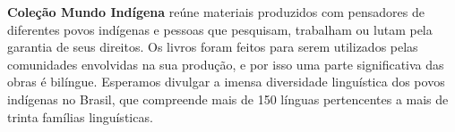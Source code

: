 \textbf{Coleção Mundo Indígena} reúne materiais produzidos com pensadores de diferentes povos indígenas e pessoas que pesquisam, trabalham ou lutam pela garantia de seus direitos. Os livros foram feitos para serem utilizados pelas comunidades envolvidas na sua produção, e por isso uma parte significativa das obras é bilíngue. Esperamos divulgar a imensa diversidade linguística dos povos indígenas no Brasil, que compreende mais de 150 línguas pertencentes a mais de trinta famílias linguísticas.




